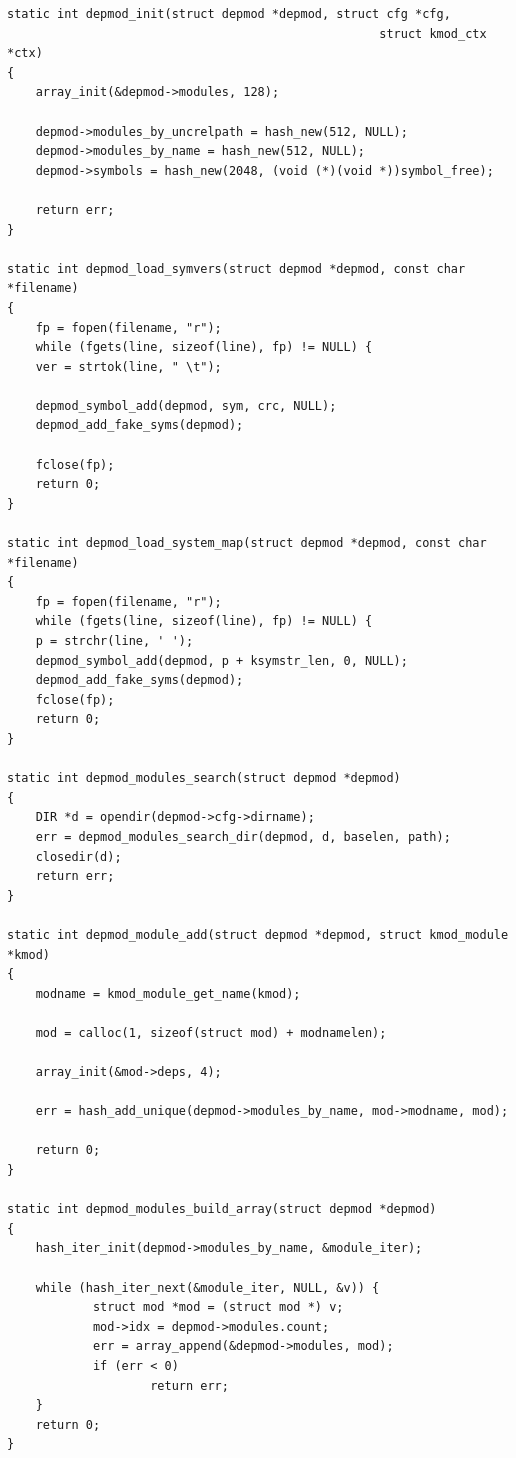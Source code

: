 \documentclass[11pt,a4paper]{article}
\begin{document}
{\begin{shaded}\begin{verbatim}
static int depmod_init(struct depmod *depmod, struct cfg *cfg,
                                                    struct kmod_ctx *ctx)
{
    array_init(&depmod->modules, 128);

    depmod->modules_by_uncrelpath = hash_new(512, NULL);
    depmod->modules_by_name = hash_new(512, NULL);
    depmod->symbols = hash_new(2048, (void (*)(void *))symbol_free);

    return err;
}

static int depmod_load_symvers(struct depmod *depmod, const char *filename)
{
    fp = fopen(filename, "r");
    while (fgets(line, sizeof(line), fp) != NULL) {
    ver = strtok(line, " \t");

    depmod_symbol_add(depmod, sym, crc, NULL);
    depmod_add_fake_syms(depmod);

    fclose(fp);
    return 0;
}

static int depmod_load_system_map(struct depmod *depmod, const char *filename)
{
    fp = fopen(filename, "r");
    while (fgets(line, sizeof(line), fp) != NULL) {
    p = strchr(line, ' ');
    depmod_symbol_add(depmod, p + ksymstr_len, 0, NULL);
    depmod_add_fake_syms(depmod);
    fclose(fp);
    return 0;
}

static int depmod_modules_search(struct depmod *depmod)
{
    DIR *d = opendir(depmod->cfg->dirname);
    err = depmod_modules_search_dir(depmod, d, baselen, path);
    closedir(d);
    return err;
}

static int depmod_module_add(struct depmod *depmod, struct kmod_module *kmod)
{
    modname = kmod_module_get_name(kmod);

    mod = calloc(1, sizeof(struct mod) + modnamelen);

    array_init(&mod->deps, 4);

    err = hash_add_unique(depmod->modules_by_name, mod->modname, mod);

    return 0;
}

static int depmod_modules_build_array(struct depmod *depmod)
{
    hash_iter_init(depmod->modules_by_name, &module_iter);

    while (hash_iter_next(&module_iter, NULL, &v)) {
            struct mod *mod = (struct mod *) v;
            mod->idx = depmod->modules.count;
            err = array_append(&depmod->modules, mod);
            if (err < 0)
                    return err;
    }
    return 0;
}


\end{verbatim}
\end{shaded}}
\end{document}
